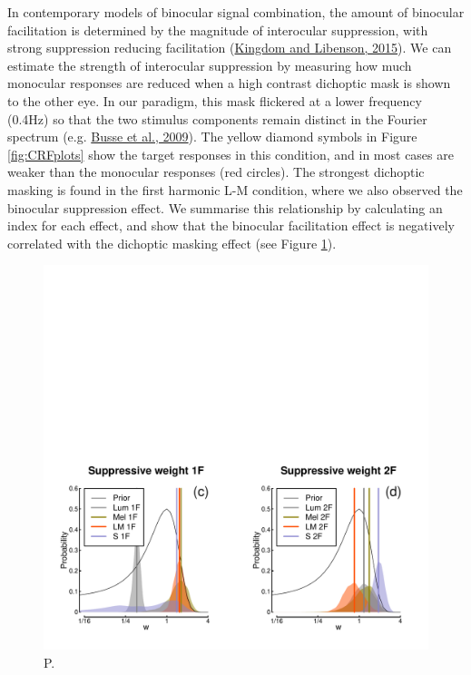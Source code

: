 \documentclass[
]{article}
\begin{document}
In contemporary models of binocular signal combination, the amount of binocular facilitation is determined by the magnitude of interocular suppression, with strong suppression reducing facilitation (\protect\hyperlink{ref-Kingdom2015}{Kingdom and Libenson, 2015}). We can estimate the strength of interocular suppression by measuring how much monocular responses are reduced when a high contrast dichoptic mask is shown to the other eye. In our paradigm, this mask flickered at a lower frequency (0.4Hz) so that the two stimulus components remain distinct in the Fourier spectrum (e.g. \protect\hyperlink{ref-Busse2009}{Busse et al., 2009}). The yellow diamond symbols in Figure \ref{fig:CRFplots} show the target responses in this condition, and in most cases are weaker than the monocular responses (red circles). The strongest dichoptic masking is found in the first harmonic L-M condition, where we also observed the binocular suppression effect. We summarise this relationship by calculating an index for each effect, and show that the binocular facilitation effect is negatively correlated with the dichoptic masking effect (see Figure \ref{fig:suppressionfig}).

\begin{figure}

{\centering \includegraphics{Figures/suppressionfig} 

}

\caption{P.}\label{fig:suppressionfig}
\end{figure}
\end{document}
